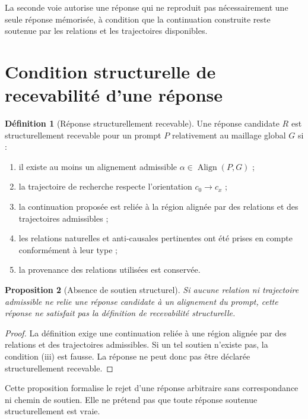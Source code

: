 \documentclass[11pt,a4paper]{report}
\theoremstyle{definition}
\newtheorem{definition}{Définition}[chapter]
\theoremstyle{plain}
\newtheorem{proposition}[definition]{Proposition}
\theoremstyle{remark}
\newcommand{\Align}{\operatorname{Align}}
\begin{document}
La seconde voie autorise une réponse qui ne reproduit pas
nécessairement une seule réponse mémorisée, à condition que
la continuation construite reste soutenue par les relations
et les trajectoires disponibles.

\section{Condition structurelle de recevabilité d'une réponse}

\begin{definition}[Réponse structurellement recevable]
Une réponse candidate \(R\) est structurellement recevable pour
un prompt \(P\) relativement au maillage global \(G\) si :

\begin{enumerate}[label=(\roman*)]
  \item il existe au moins un alignement admissible
        \(\alpha\in\Align(P,G)\) ;
  \item la trajectoire de recherche respecte l'orientation
        \(c_0\to c_x\) ;
  \item la continuation proposée est reliée à la région alignée
        par des relations et des trajectoires admissibles ;
  \item les relations naturelles et anti-causales pertinentes
        ont été prises en compte conformément à leur type ;
  \item la provenance des relations utilisées est conservée.
\end{enumerate}
\end{definition}

\begin{proposition}[Absence de soutien structurel]
Si aucune relation ni trajectoire admissible ne relie une réponse
candidate à un alignement du prompt, cette réponse ne satisfait
pas la définition de recevabilité structurelle.
\end{proposition}

\begin{proof}
La définition exige une continuation reliée à une région alignée
par des relations et des trajectoires admissibles. Si un tel
soutien n'existe pas, la condition (iii) est fausse. La réponse
ne peut donc pas être déclarée structurellement recevable.
\end{proof}

Cette proposition formalise le rejet d'une réponse arbitraire
sans correspondance ni chemin de soutien. Elle ne prétend pas
que toute réponse soutenue structurellement est vraie.
\end{document}

